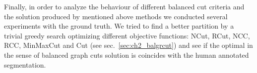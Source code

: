 Finally, in order to analyze the behaviour of different balanced cut criteria and the solution produced by mentioned above methods we conducted several experiments with the ground truth. We tried to find a better partition by 
a trivial greedy search optimizing different objective functions: NCut, RCut, NCC, RCC, MinMaxCut and Cut (see sec.~\ref{sec:ch2_balgrcut}) and see if the optimal in the sense of balanced graph cuts solution is coincides with the 
human annotated segmentation.  
% 
% 
% 
% 
